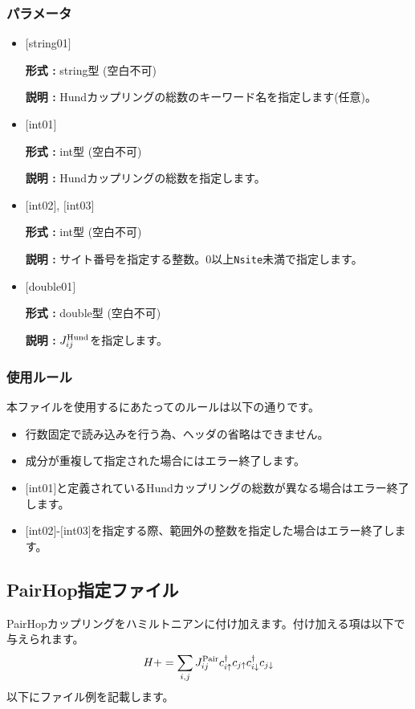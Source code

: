 \subsubsection{パラメータ}
 \begin{itemize}

   \item  $[$string01$]$
   
    {\bf 形式 :} string型 (空白不可)

   {\bf 説明 :} Hundカップリングの総数のキーワード名を指定します(任意)。

   \item  $[$int01$]$
   
    {\bf 形式 :} int型 (空白不可)

   {\bf 説明 :} Hundカップリングの総数を指定します。

  \item  $[$int02$]$, $[$int03$]$
  
 {\bf 形式 :} int型 (空白不可)

{\bf 説明 :} サイト番号を指定する整数。0以上\verb|Nsite|{未満}で指定します。
 
 \item  $[$double01$]$
   
   {\bf 形式 :} double型 (空白不可)

  {\bf 説明 :}  $J_{ij}^{\rm Hund}$を指定します。
  
\end{itemize}

\subsubsection{使用ルール}
本ファイルを使用するにあたってのルールは以下の通りです。
\begin{itemize}
\item 行数固定で読み込みを行う為、ヘッダの省略はできません。
\item 成分が重複して指定された場合にはエラー終了します。
\item $[$int01$]$と定義されているHundカップリングの総数が異なる場合はエラー終了します。
\item $[$int02$]$-$[$int03$]$を指定する際、範囲外の整数を指定した場合はエラー終了します。
\end{itemize}

\newpage
\subsection{PairHop指定ファイル}
PairHopカップリングをハミルトニアンに付け加えます。付け加える項は以下で与えられます。
\begin{equation}
H+=\sum_{i,j}J_{ij}^{\rm Pair} c_ {i \uparrow}^{\dag}c_{j\uparrow}c_{i \downarrow}^{\dag}c_{j  \downarrow}
\end{equation}
以下にファイル例を記載します。

